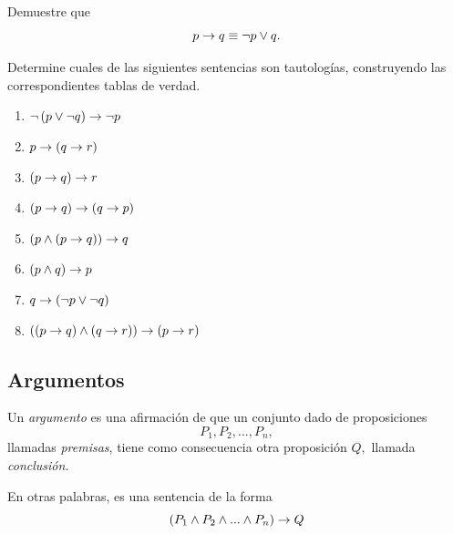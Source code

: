  \begin{resuelto}
  Demuestre que $$p\rightarrow q \equiv \neg p \vee q.$$
 \end{resuelto}




 \begin{resuelto} Determine cuales de las siguientes sentencias son tautologías, construyendo las correspondientes tablas de verdad.
  \begin{enumerate}
   \item $\neg\left( p \vee \neg q \right) \rightarrow \neg p$
   \item $p \rightarrow \left( q\rightarrow r \right)$
   \item $\left( p \rightarrow q \right)\rightarrow r$
   \item $\left( p\rightarrow q \right) \rightarrow \left( q\rightarrow p \right)$
   \item $\left( p \wedge \left( p \rightarrow q \right) \right) \rightarrow q$
   \item $\left( p \wedge q \right) \rightarrow p$
   \item $q \rightarrow \left( \neg p \vee \neg q \right)$
   \item $\left( \left( p\rightarrow q \right) \wedge \left( q \rightarrow r \right) \right) \rightarrow \left( p \rightarrow r \right)$
  \end{enumerate}

 \end{resuelto}



\subsection{Argumentos}


 Un \emph{argumento} es una afirmación de que un conjunto dado de proposiciones $$P_{1}, P_{2},...,P_{n},$$ llamadas \emph{premisas}, tiene como consecuencia otra proposición $Q,$ llamada \emph{conclusión.}
 
 En otras palabras, es una sentencia de la forma
 $$
  \left( P_{1} \wedge P_{2} \wedge...\wedge P_{n}\right) \rightarrow Q
  $$
 
